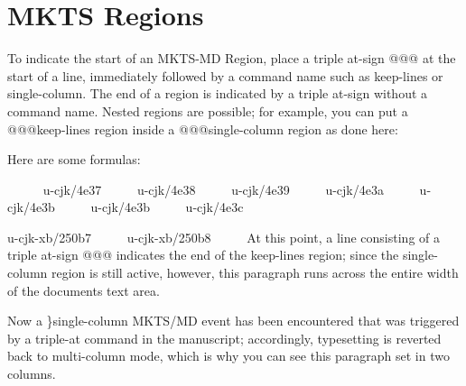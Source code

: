 \section{MKTS Regions 
}
\begin{multicols}{2}To indicate the start of an MKTS-MD Region, place a triple at-sign {\mktsStyleCode{}@@@}
at the start of a line, immediately followed by a command name such as
{\mktsStyleCode{}keep-lines} or {\mktsStyleCode{}single-column}. The end of a region is indicated by a
triple at-sign without a command name. Nested regions are possible; for example,
you can put a {\mktsStyleCode{}@@@keep-lines} region inside a {\mktsStyleCode{}@@@single-column} region as
done here:\mktsShowpar\par
\end{multicols}Here are some formulas:
\mktsShowpar\par
\begingroup{}     
{\mktsStyleCode{}u-cjk/4e37}     
{\mktsStyleCode{}u-cjk/4e38}     
{\mktsStyleCode{}u-cjk/4e39}     
{\mktsStyleCode{}u-cjk/4e3a}     
{\mktsStyleCode{}u-cjk/4e3b}     
{\mktsStyleCode{}u-cjk/4e3b}     
{\mktsStyleCode{}u-cjk/4e3c}     

{\mktsStyleCode{}u-cjk-xb/250b7}     
{\mktsStyleCode{}u-cjk-xb/250b8}     
\endgroup{}At this point, a line consisting of a triple at-sign {\mktsStyleCode{}@@@}
indicates the end of the {\mktsStyleCode{}keep-lines} region; since the
{\mktsStyleCode{}single-column} region is still active, however, {\mktsStyleItalic{}this
paragraph runs across the entire width\/} of the documents text
area.
\begin{multicols}{2}Now a {\mktsStyleCode{}\}single-column} MKTS/MD event has been encountered
that was triggered by a triple-at command in the manuscript;
accordingly, typesetting is reverted back to multi-column mode,
which is why you can see this paragraph set in two columns.\mktsShowpar\par
\end{multicols}
